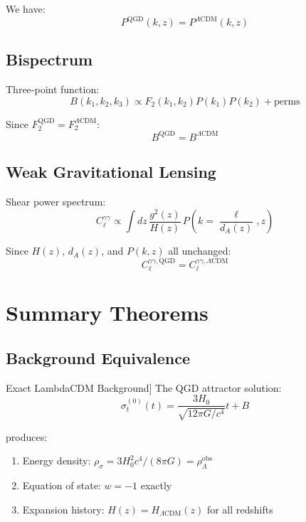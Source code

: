 \documentclass[11pt,a4paper]{article}
\theoremstyle{definition}
\theoremstyle{remark}
\begin{document}
	We have:
	\begin{equation}
		\boxed{P^{\text{QGD}}(k,z) = P^{\Lambda\text{CDM}}(k,z)}
	\end{equation}
	
	\subsection{Bispectrum}
	
	Three-point function:
	\begin{equation}
		B(k_1, k_2, k_3) \propto F_2(k_1, k_2)P(k_1)P(k_2) + \text{perms}
	\end{equation}
	
	Since $F_2^{\text{QGD}} = F_2^{\Lambda\text{CDM}}$:
	\begin{equation}
		\boxed{B^{\text{QGD}} = B^{\Lambda\text{CDM}}}
	\end{equation}
	
	\subsection{Weak Gravitational Lensing}
	
	Shear power spectrum:
	\begin{equation}
		C_\ell^{\gamma\gamma} \propto \int dz\,\frac{g^2(z)}{H(z)}\,P\left(k = \frac{\ell}{d_A(z)}, z\right)
	\end{equation}
	
	Since $H(z)$, $d_A(z)$, and $P(k,z)$ all unchanged:
	\begin{equation}
		\boxed{C_\ell^{\gamma\gamma, \text{QGD}} = C_\ell^{\gamma\gamma, \Lambda\text{CDM}}}
	\end{equation}
	
	\section{Summary Theorems}
	
	\subsection{Background Equivalence}
	
	Exact LambdaCDM Background]
		The QGD attractor solution:
		\begin{equation}
			\sigma_t^{(0)}(t) = \frac{3H_0}{\sqrt{12\pi G/c^4}}t + B
		\end{equation}
		
		produces:
		\begin{enumerate}
			\item Energy density: $\rho_\sigma = 3H_0^2c^4/(8\pi G) = \rho_\Lambda^{\text{obs}}$
			\item Equation of state: $w = -1$ exactly
			\item Expansion history: $H(z) = H_{\Lambda\text{CDM}}(z)$ for all redshifts
		\end{enumerate}
	
\end{document}
